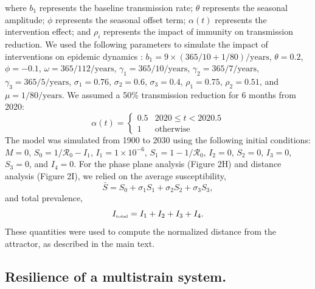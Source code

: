 \documentclass[12pt]{article}
\newcommand{\tsub}[2]{#1_{{\textrm{\tiny #2}}}}
\begin{document}
where $b_1$ represents the baseline transmission rate; $\theta$ represents the seasonal amplitude; $\phi$ represents the seasonal offset term; $\alpha(t)$ represents the intervention effect; and $\rho_i$ represents the impact of immunity on transmission reduction.
We used the following parameters to simulate the impact of interventions on epidemic dynamics \citep{pitzer2015environmental}: $b_1 = 9 \times (365/10+1/80)/\mathrm{years}$, $\theta = 0.2$, $\phi = -0.1$, $\omega=365/112/\mathrm{years}$, $\gamma_1=365/10/\mathrm{years}$, $\gamma_2=365/7/\mathrm{years}$, $\gamma_3=365/5/\mathrm{years}$, $\sigma_1 = 0.76$, $\sigma_2 = 0.6$, $\sigma_3 = 0.4$, $\rho_1 = 0.75$, $\rho_2 = 0.51$, and $\mu = 1/80/\mathrm{years}$.
We assumed a 50\% transmission reduction for 6 months from 2020:
\begin{equation}
\alpha(t) = \begin{cases}
0.5 & 2020 \leq t< 2020.5\\
1 & \textrm{otherwise}
\end{cases}
\end{equation}
The model was simulated from 1900 to 2030 using the following initial conditions: $M=0$, $S_0=1/\mathcal R_0-I_1$, $I_1=1\times 10^{-6}$, $S_1=1-1/\mathcal R_0$, $I_2=0$, $S_2=0$, $I_3=0$, $S_3=0$, and $I_4=0$.
For the phase plane analysis (Figure 2H) and distance analysis (Figure 2I), we relied on the average susceptibility,
\begin{equation}
\bar{S} = S_0 + \sigma_1 S_1 + \sigma_2 S_2 + \sigma_3 S_3,
\end{equation}
and total prevalence,
\begin{equation}
\tsub{I}{total} = I_1 + I_2 + I_3 + I_4.
\end{equation}
These quantities were used to compute the normalized distance from the attractor, as described in the main text.

\subsection*{Resilience of a multistrain system.}
\end{document}
